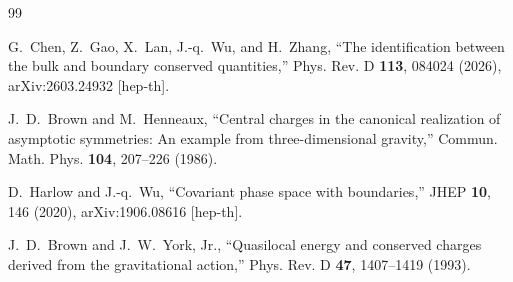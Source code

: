 \begin{thebibliography}{99}

G.~Chen, Z.~Gao, X.~Lan, J.-q.~Wu, and H.~Zhang,
``The identification between the bulk and boundary conserved quantities,''
Phys. Rev. D \textbf{113}, 084024 (2026),
arXiv:2603.24932 [hep-th].

J.~D.~Brown and M.~Henneaux,
``Central charges in the canonical realization of asymptotic symmetries: An example from three-dimensional gravity,''
Commun. Math. Phys. \textbf{104}, 207--226 (1986).

D.~Harlow and J.-q.~Wu,
``Covariant phase space with boundaries,''
JHEP \textbf{10}, 146 (2020),
arXiv:1906.08616 [hep-th].

J.~D.~Brown and J.~W.~York, Jr.,
``Quasilocal energy and conserved charges derived from the gravitational action,''
Phys. Rev. D \textbf{47}, 1407--1419 (1993).

\end{thebibliography}
